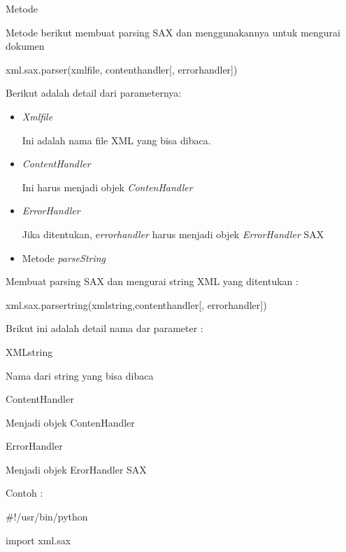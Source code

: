 \noindent 
Metode\par
Metode berikut membuat parsing SAX dan menggunakannya untuk mengurai dokumen \par
\vspace{10pt}
{\fontsize{10pt}{10pt}\selectfont xml.sax.parser(xmlfile, contenthandler[, errorhandler])} \par
\vspace{10pt}
Berikut adalah detail dari parameternya: \par
\noindent 
\begin{itemize}
\item \textit{Xmlfile } \par
Ini adalah nama file XML yang bisa dibaca. \par
\noindent 
\item \textit{ContentHandler } \par
Ini harus menjadi objek \textit{ContenHandler} \par
\noindent 
\item \textit{ErrorHandler} \par
Jika ditentukan, e\textit{rrorhandler} harus menjadi objek \textit{ErrorHandler} SAX \par
\noindent 
\item Metode\textit{ parseString}\end{itemize}
 \par
Membuat parsing SAX dan mengurai string XML yang ditentukan : \par
\vspace{12pt}
{\fontsize{10pt}{10pt}\selectfont xml.sax.parsertring(xmlstring,contenthandler[, errorhandler])} \par
\vspace{12pt}
Brikut ini adalah detail nama dar parameter : \par
\noindent 
{XMLstring} \par
Nama dari string yang bisa dibaca \par
\noindent 
{ContentHandler} \par
Menjadi objek ContenHandler \par
\noindent 
{ErrorHandler} \par
Menjadi objek ErorHandler SAX \par
\vspace{12pt}
\noindent 
Contoh : \par
\noindent 
 $  \#  $!/usr/bin/python \par
\vspace{12pt}
\noindent 
import xml.sax \par
